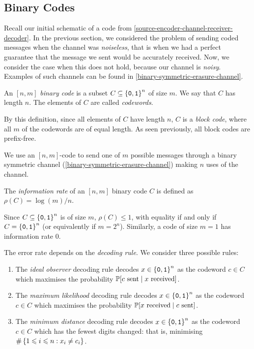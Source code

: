 \documentclass{article}
\begin{document}
\subsection{Binary Codes}

Recall our initial schematic of a code from \ref{source-encoder-channel-receiver-decoder}. In the previous section, we considered the problem of sending coded messages when the channel was \textit{noiseless}, that is when we had a perfect guarantee that the message we sent would be accurately received. Now, we consider the case when this does not hold, because our channel is \textit{noisy}. Examples of such channels can be found in \ref{binary-symmetric-erasure-channel}.

\begin{definition}
    An $[n, m]$ \textit{binary code} is a subset $C \subs \binset^n$ of size $m$. We say that $C$ has length $n$. The elements of $C$ are called \textit{codewords}.
\end{definition}

\begin{note}
	By this definition, since all elements of $C$ have length $n$, $C$ is a \textit{block code}, where all $m$ of the codewords are of equal length. As seen previously, all block codes are prefix-free.
\end{note}

We use an $[n, m]$-code to send one of $m$ possible messages through a binary symmetric channel (\ref{binary-symmetric-erasure-channel}) making $n$ uses of the channel.

\begin{definition}
	\label{information-rate}
    The \textit{information rate} of an $[n, m]$ binary code $C$ is defined as $\rho(C) = \log(m)/n$.
\end{definition}

\begin{corollary}
    Since $C \subs \binset^n$ is of size $m$, $\rho(C) \leq 1$, with equality if and only if $C = \binset^n$ (or equivalently if $m = 2^n$). Similarly, a code of size $m=1$ has information rate 0. 
\end{corollary}

The error rate depends on the \textit{decoding rule}. We consider three possible rules:
\begin{enumerate}
    \item The \textit{ideal observer} decoding rule decodes $x \in \binset^n$ as the codeword $c \in C$ which maximises the probability $\P[c \text{ sent} \mid x \text{ received}]$.
    \item The \textit{maximum likelihood} decoding rule decodes $x \in \binset^n$ as the codeword $c \in C$ which maximises the probability $\P[x \text{ received} \mid c \text{ sent}]$.
    \item The \textit{minimum distance} decoding rule decodes $x \in \binset^n$ as the codeword $c \in C$ which has the fewest digits changed: that is, minimising $\#\set{1 \leq i \leq n : x_i \neq c_i}$.
\end{enumerate}
\end{document}
